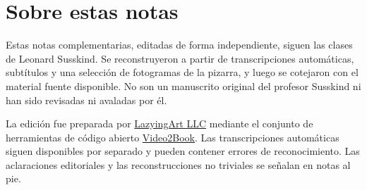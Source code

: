 \documentclass[11pt,oneside]{book}
\begin{document}
\frontmatter
\hypersetup{pageanchor=false}

\hypersetup{pageanchor=true}

\clearpage
\chapter*{Sobre estas notas}
Estas notas complementarias, editadas de forma independiente, siguen las clases de Leonard Susskind. Se reconstruyeron a partir de transcripciones automáticas, subtítulos y una selección de fotogramas de la pizarra, y luego se cotejaron con el material fuente disponible. No son un manuscrito original del profesor Susskind ni han sido revisadas ni avaladas por él.

La edición fue preparada por \href{https://lazying.art}{LazyingArt LLC} mediante el conjunto de herramientas de código abierto \href{https://github.com/lachlanchen/Video2Book}{Video2Book}. Las transcripciones automáticas siguen disponibles por separado y pueden contener errores de reconocimiento. Las aclaraciones editoriales y las reconstrucciones no triviales se señalan en notas al pie.
\clearpage
\tableofcontents
\mainmatter









\end{document}
